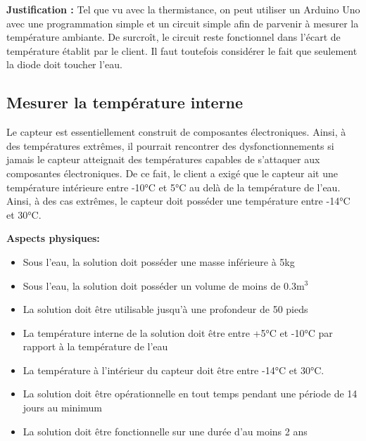 \textbf{Justification :} Tel que vu avec la thermistance, on peut utiliser un Arduino Uno avec une programmation simple et un circuit simple afin de parvenir à mesurer la température ambiante. De surcroît, le circuit reste fonctionnel dans l’écart de température établit par le client. Il faut toutefois considérer le fait que seulement la diode doit toucher l'eau.

\begin{table}[!htb]
\footnotesize
\centering
{}
\caption{Évaluation globales des concepts pour la mesure de la température externe}
\label{t:Decision_thermo_ext}
\end{table}


\subsection{Mesurer la température interne}
Le capteur est essentiellement construit de composantes électroniques. Ainsi, à des températures extrêmes, il pourrait rencontrer des dysfonctionnements si jamais le capteur atteignait des températures capables de s'attaquer aux composantes électroniques. De ce fait, le client a exigé que le capteur ait une température intérieure entre -10°C et 5°C au delà de la température de l'eau. Ainsi, à des cas extrêmes, le capteur doit posséder une température entre -14°C et 30°C.

\textbf{Aspects physiques:}
\begin{itemize}[label = {--}]
    \item Sous l'eau, la solution doit posséder une masse inférieure à 5kg
    \item Sous l'eau, la solution doit posséder un volume de moins de 0.3m$^3$
    \item La solution doit être utilisable jusqu'à une profondeur de 50 pieds
    \item La température interne de la solution doit être entre +5°C et -10°C par rapport à la température de l'eau
    \item La température à l'intérieur du capteur doit être entre -14°C et 30°C.
    \item La solution doit être opérationnelle en tout temps pendant une période de 14 jours au minimum
    \item La solution doit être fonctionnelle sur une durée d'au moins 2 ans
\end{itemize}

